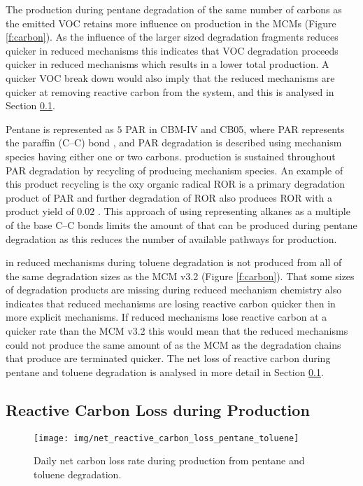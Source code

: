 The  production during pentane degradation of the same number of carbons as the emitted VOC retains more influence on  production in the MCMs (Figure \ref{f:carbon}).
As the influence of the larger sized degradation fragments reduces quicker in reduced mechanisms this indicates that VOC degradation proceeds quicker in reduced mechanisms which results in a lower total  production.
A quicker VOC break down would also imply that the reduced mechanisms are quicker at removing reactive carbon from the system, and this is analysed in Section \ref{ss:carbon_loss}.

Pentane is represented as $5$ PAR in CBM-IV and CB05, where PAR represents the paraffin (C--C) bond \citep{Gery:1989, Yarwood:2005}, and PAR degradation is described using mechanism species having either one or two carbons.
 production is sustained throughout PAR degradation by recycling of  producing mechanism species.
An example of this product recycling is the oxy organic radical ROR is a primary degradation product of PAR and further degradation of ROR also produces ROR with a product yield of $0.02$ \citep{Gery:1989}.
This approach of using representing alkanes as a multiple of the base C--C bonds limits the amount of  that can be produced during pentane degradation as this reduces the number of available pathways for  production.

 in reduced mechanisms during toluene degradation is not produced from all of the same degradation sizes as the MCM v3.2 (Figure \ref{f:carbon}).
That some sizes of degradation products are missing during reduced mechanism chemistry also indicates that reduced mechanisms are losing reactive carbon quicker then in more explicit mechanisms.
If reduced mechanisms lose reactive carbon at a quicker rate than the MCM v3.2 this would mean that the reduced mechanisms could not produce the same amount of  as the MCM as the degradation chains that produce  are terminated quicker.
The net loss of reactive carbon during pentane and toluene degradation is analysed in more detail in Section \ref{ss:carbon_loss}.

\subsection[Reactive Carbon Loss during Ox Production]{Reactive Carbon Loss during  Production} \label{ss:carbon_loss}

\begin{figure}
    \centering
    \texttt{[image: img/net\_reactive\_carbon\_loss\_pentane\_toluene]}
    \vspace{0mm}
    \caption{Daily net carbon loss rate during  production from pentane and toluene degradation.}
    \vspace{-4mm}
    \label{f:net_carbon_loss}
\end{figure}

